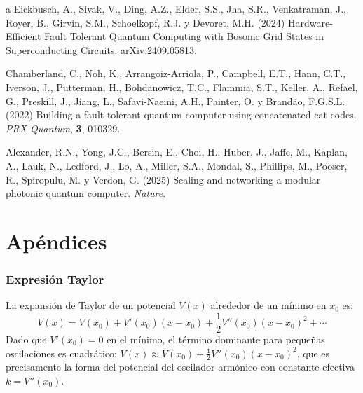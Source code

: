 \documentclass[11pt,a4paper,spanish]{book}
\begin{document}
\begin{thebibliography}{a}
 Eickbusch, A., Sivak, V., Ding, A.Z., Elder, S.S., Jha, S.R., Venkatraman, J., Royer, B., Girvin, S.M., Schoelkopf, R.J. y Devoret, M.H. (2024) Hardware-Efficient Fault Tolerant Quantum Computing with Bosonic Grid States in Superconducting Circuits. arXiv:2409.05813.

 Chamberland, C., Noh, K., Arrangoiz-Arriola, P., Campbell, E.T., Hann, C.T., Iverson, J., Putterman, H., Bohdanowicz, T.C., Flammia, S.T., Keller, A., Refael, G., Preskill, J., Jiang, L., Safavi-Naeini, A.H., Painter, O. y Brandão, F.G.S.L. (2022) Building a fault-tolerant quantum computer using concatenated cat codes. \textit{PRX Quantum}, \textbf{3}, 010329.

 Alexander, R.N., Yong, J.C., Bersin, E., Choi, H., Huber, J., Jaffe, M., Kaplan, A., Lauk, N., Ledford, J., Lo, A., Miller, S.A., Mondal, S., Phillips, M., Pooser, R., Spiropulu, M. y Verdon, G. (2025) Scaling and networking a modular photonic quantum computer. \textit{Nature}.


\end{thebibliography}
% 
%


\appendix
\chapter{Apéndices}

\subsection{Expresión Taylor} \label{sec:taylor}
La expansión de Taylor de un potencial $V(x)$ alrededor de un mínimo en $x_0$ es:
\[
V(x) = V(x_0) + V'(x_0)(x - x_0) + \frac{1}{2}V''(x_0)(x - x_0)^2 + \cdots
\]
Dado que $V'(x_0) = 0$ en el mínimo, el término dominante para pequeñas oscilaciones es cuadrático: $V(x) \approx V(x_0) + \frac{1}{2}V''(x_0)(x - x_0)^2$, que es precisamente la forma del potencial del oscilador armónico con constante efectiva $k = V''(x_0)$.
\end{document}
